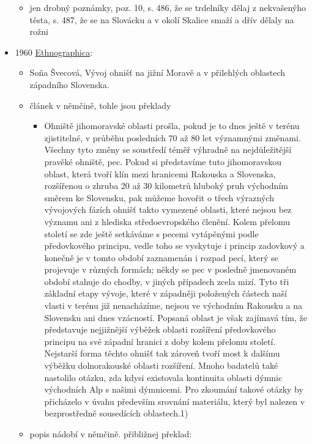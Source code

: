 \begin{itemize}
  \begin{itemize}
  \tightlist
  \item
    jen drobný poznámky, poz. 10, s. 486, že se trdelníky dělaj z
    nekvašenýho těsta, s. 487, že se na Slovácku a v okolí Skalice smaží
    a dřív dělaly na rožni
  \end{itemize}
\item
  1960
  \href{https://ceskadigitalniknihovna.cz/view/uuid:747980d0-a9c9-11e7-920d-005056827e51?page=uuid\%3A6d279530-a5e3-11e8-8b41-005056822549&fulltext=trdlovec&source=nkp}{Ethnographica}:

  \begin{itemize}
  \tightlist
  \item
    Soňa Švecová, Vývoj ohnišť na jižní Moravě a v přilehlých oblastech
    západního Slovenska.
  \item
    článek v němčině, tohle jsou překlady

    \begin{itemize}
    \tightlist
    \item
      Ohniště jihomoravské oblasti prošla, pokud je to dnes ještě v
      terénu zjistitelné, v průběhu posledních 70 až 80 let významnými
      změnami. Všechny tyto změny se soustředí téměř výhradně na
      nejdůležitější pravěké ohniště, pec. Pokud si představíme tuto
      jihomoravskou oblast, která tvoří klín mezi hranicemi Rakouska a
      Slovenska, rozšířenou o zhruba 20 až 30 kilometrů hluboký pruh
      východním směrem ke Slovensku, pak můžeme hovořit o třech
      výrazných vývojových fázích ohnišť takto vymezené oblasti, které
      nejsou bez významu ani z hlediska středoevropského členění. Kolem
      přelomu století se zde ještě setkáváme s pecemi vytápěnými podle
      předovkového principu, vedle toho se vyskytuje i princip zadovkový
      a konečně je v tomto období zaznamenán i rozpad pecí, který se
      projevuje v různých formách; někdy se pec v posledně jmenovaném
      období stahuje do chodby, v jiných případech zcela mizí. Tyto tři
      základní etapy vývoje, které v západněji položených částech naší
      vlasti v terénu již nenacházíme, nejsou ve východním Rakousku a na
      Slovensku ani dnes vzácností. Popsaná oblast je však zajímavá tím,
      že představuje nejjižnější výběžek oblasti rozšíření předovkového
      principu na své západní hranici z doby kolem přelomu století.
      Nejstarší forma těchto ohnišť tak zároveň tvoří most k dalšímu
      výběžku dolnorakouské oblasti rozšíření. Mnoho badatelů také
      nastolilo otázku, zda kdysi existovala kontinuita oblasti dýmnic
      východních Alp s našimi dýmnicemi. Pro zkoumání takové otázky by
      přicházelo v úvahu především srovnání materiálu, který byl nalezen
      v bezprostředně sousedících oblastech.1)
    \end{itemize}
  \item
    popis nádobí v němčině. přibližnej překlad:


\end{itemize}
\end{itemize}
